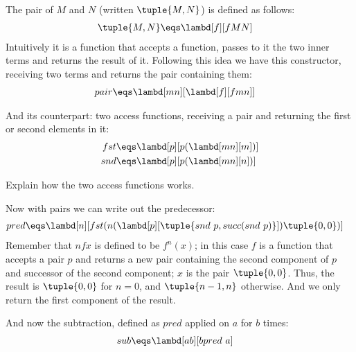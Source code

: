 \documentclass[../../../include/open-logic-section]{subfiles}
\begin{document}

The pair of $M$ and $N$ (written $\tuple{M,N}$) is defined as follows:
\begin{align*}
  \tuple{M,N} &\eqs \lambd[f][fMN]
\end{align*}
Intuitively it is a function that accepts a function, passes to it the
two inner terms and returns the result of it. Following this idea we
have this constructor, receiving two terms and returns the pair
containing them:
\begin{align*}
  {pair} &\eqs \lambd[mn][\lambd[f][fmn]]
\end{align*}

And its counterpart: two access functions, receiving a pair and
returning the first or second elements in it:
\begin{align*}
  {fst} &\eqs \lambd[p][p(\lambd[mn][m])]\\
  {snd} &\eqs \lambd[p][p(\lambd[mn][n])]
\end{align*}

\begin{prob}
  Explain how the two access functions works.
\end{prob}

Now with pairs we can write out the predecessor:
\begin{align*}
  {pred} &\eqs \lambd[n][{fst}(n (\lambd[p][\tuple{{snd}~ {p}, {succ}({snd} ~{p})}]) \tuple{0, 0})]
\end{align*}
Remember that $n f x$ is defined to be $f^{n}(x)$; in this
case $f$ is a function that accepts a pair $p$ and returns a new
pair containing the second component of $p$ and successor of the
second component; $x$ is the pair $\tuple{0,0}$. Thus, the
result is $\tuple{0,0}$ for $n=0$, and $\tuple{{n-1}, n}$
otherwise. And we only return the first component of the result.

And now the subtraction, defined as $pred$ applied on $a$ for $b$ times:
\begin{align*}
  {sub} &\eqs \lambd[ab][b {pred} ~ a]
\end{align*}
\end{document}
